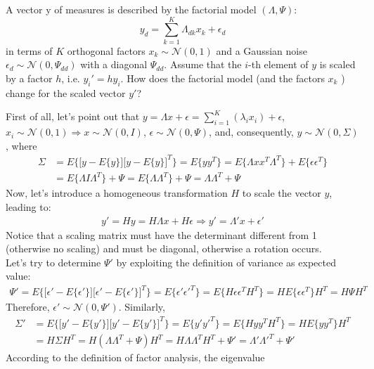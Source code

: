 \Exercise[number={11}]
A vector y of measures is described by the factorial model \((\Lambda, \Psi)\):
\[
    y_d=\sum_{k=1}^{K} \Lambda_{dk}x_k+\epsilon_d
\]
in terms of \(K\) orthogonal factors \(x_k\sim \mathcal{N}(0,1)\) and a Gaussian
noise \(\epsilon_d \sim \mathcal{N}(0, \Psi_{dd})\) with a diagonal \(\Psi_{dd}\).
Assume that the \(i\)-th element of \(y\) is scaled by a factor \(h\), i.e.
\(y_i'=h y_i\). How does the factorial model (and the factors \(x_k\) ) change
for the scaled vector \(y'\)?

\Answer[number={11}]
First of all, let's point out that
\(y=\Lambda x + \epsilon = \sum_{i=1}^{K}(\lambda_i x_i)+\epsilon\),
\(x_i\sim\mathcal{N}(0, 1) \Rightarrow x\sim\mathcal{N}(0, I)\),
\(\epsilon\sim\mathcal{N}(0, \Psi)\), and, consequently,
\(y\sim\mathcal{N}(0, \Sigma)\), where
\begin{align*}
    \Sigma
    &=E\{\bigl[y-E\{y\}\bigr]\bigr[y-E\{y\}\bigr]^T\}
    =E\{yy^T\}
    =E\{\Lambda x x^T \Lambda^T\} + E\{\epsilon\epsilon^T\}\\
    &=E\{\Lambda I \Lambda^T\} + \Psi
    =E\{\Lambda\Lambda^T\} + \Psi
    =\Lambda\Lambda^T + \Psi
\end{align*}
Now, let's introduce a homogeneous transformation \(H\) to scale the
vector \(y\), leading to:
\begin{align*}
    y'=Hy=H\Lambda x + H\epsilon \Rightarrow y'=\Lambda'x + \epsilon'
\end{align*}
Notice that a scaling matrix must have the determinant different from 1
(otherwise no scaling) and must be diagonal, otherwise a rotation occurs. \\
Let's try to determine \(\Psi'\) by exploiting the
definition of variance as expected value:
\begin{align*}
    \Psi'
    =E\{\bigl[\epsilon'-E\{\epsilon'\}\bigr]\bigr[\epsilon'-E\{\epsilon'\}\bigr]^T\}
    =E\{\epsilon'\epsilon'^T\}
    =E\{H\epsilon\epsilon^T H^T\}
    =HE\{\epsilon\epsilon^T\}H^T
    =H\Psi H^T
\end{align*}
Therefore, \(\epsilon'\sim\mathcal{N}(0, \Psi')\). Similarly,
\begin{align*}
    \Sigma'
    &=E\{\bigl[y'-E\{y'\}\bigr]\bigr[y'-E\{y'\}\bigr]^T\}
    =E\{y'y'^T\}
    =E\{Hyy^T H^T\}
    =HE\{yy^T\}H^T\\
    &=H\Sigma H^T
    =H(\Lambda\Lambda^T + \Psi)H^T
    =H\Lambda\Lambda^T H^T + \Psi'
    =\Lambda'\Lambda'^T + \Psi'
\end{align*}
According to the definition of factor analysis, the eigenvalue
